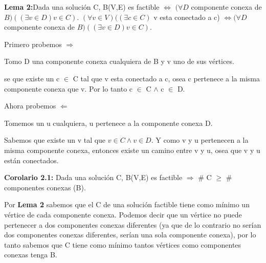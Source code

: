 \textbf{Lema 2:}Dada una solución C, B(V,E) es factible $\Longleftrightarrow$ $(\forall D$ componente conexa de $B)((\exists v \in D) v \in C)$.  $(\forall v \in V)((\exists c \in C)$ v esta conectado a c) $\Leftrightarrow (\forall D$ componente conexa de $B)((\exists v \in D) v \in C)$.


Primero probemos $\Rightarrow$

Tomo D una componente conexa cualquiera de B y v uno de sus vértices.

se que existe un c $\in$ C tal que v esta conectado a c, osea c pertenece a la misma componente conexa que v. Por lo tanto c $\in$ C $\wedge$ c $\in$ D.

Ahora probemos $\Leftarrow$

Tomemos un u cualquiera, u pertenece a la componente conexa D.

Sabemos que existe un v tal que $v \in C \wedge v \in D$. Y como v y u pertenecen a la misma componente conexa, entonces existe un camino entre v y u, osea que v y u están conectados.

\textbf{Corolario 2.1:} Dada una solución C, B(V,E) es factible $\Rightarrow$ \# C $\geq$ \# componentes conexas (B).

Por \textbf{Lema 2} sabemos que el C de una solución factible tiene como mínimo un vértice de cada componente conexa. Podemos decir que un vértice no puede pertenecer a dos componentes conexas diferentes (ya que de lo contrario no serían dos componentes conexas diferentes, serían una sola componente conexa), por lo tanto sabemos que C tiene como mínimo tantos vértices como componentes conexas tenga B.

%
%
%
%
%


